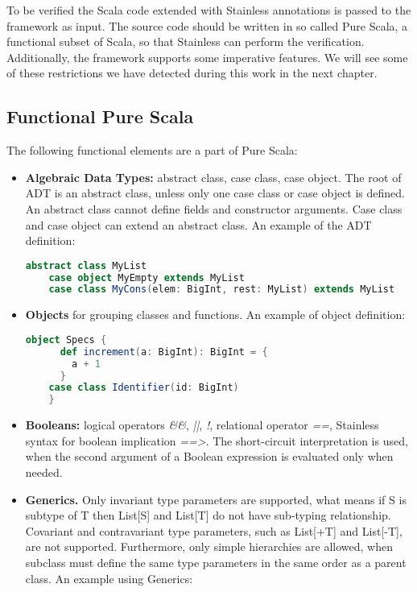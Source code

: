 To be verified the Scala code extended with Stainless annotations is passed to the framework as input.
The source code should be written in so called Pure Scala, a functional subset of Scala, so that Stainless can perform the verification.
Additionally, the framework supports some imperative features.
We will see some of these restrictions we have detected during this work in the next chapter.

\subsection{Functional Pure Scala}
The following functional elements are a part of Pure Scala:
\begin{itemize}
  \item \textbf{Algebraic Data Types:} abstract class, case class, case object. 
  The root of ADT is an abstract class, unless only one case class or case object is defined.
  An abstract class cannot define fields and constructor arguments. 
  Case class and case object can extend an abstract class.
  An example of the ADT definition:
  \begin{lstlisting}[language=Scala]
    abstract class MyList
    case object MyEmpty extends MyList
    case class MyCons(elem: BigInt, rest: MyList) extends MyList
  \end{lstlisting}
  \item \textbf{Objects} for grouping classes and functions.
  An example of object definition:
  \begin{lstlisting}[language=Scala]
    object Specs {
      def increment(a: BigInt): BigInt = {
        a + 1
      }
    case class Identifier(id: BigInt)
    }
  \end{lstlisting}
  \item \textbf{Booleans:} logical operators  \textit{\&\&}, \textit{||}, \textit{!}, relational operator \textit{==}, Stainless syntax for boolean implication \textit{==>}. 
  The short-circuit interpretation is used, when the second argument of a Boolean expression is evaluated only when needed.
  \item \textbf{Generics.} Only invariant type parameters are supported, what means if S is subtype of T then List[S] and List[T] do not have sub-typing relationship.
  Covariant and contravariant type parameters, such as List[+T] and List[-T], are not supported. 
  Furthermore, only simple hierarchies are allowed, when subclass must define the same type parameters in the same order as a parent class.
  An example using Generics:

\end{itemize}
